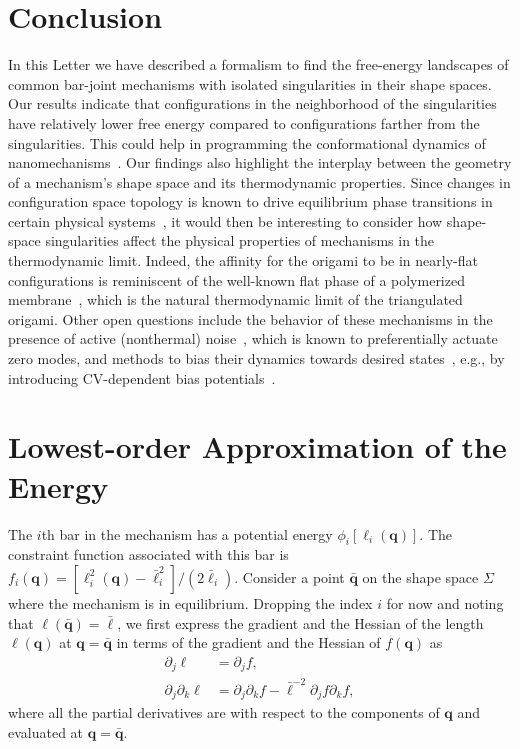\section{Conclusion}

In this Letter we have described a formalism to find the free-energy landscapes of common bar-joint mechanisms with isolated singularities in their shape spaces.
Our results indicate that configurations in the neighborhood of the singularities have relatively lower free energy compared to configurations farther from the singularities.
This could help in programming the conformational dynamics of nanomechanisms~\cite{dunn2015}.
Our findings also highlight the interplay between the geometry of a mechanism's shape space and its thermodynamic properties.
Since changes in configuration space topology is known to drive equilibrium phase transitions in certain physical systems~\cite{kastner2008}, it would then be interesting to consider how shape-space singularities affect the physical properties of mechanisms in the thermodynamic limit.
Indeed, the affinity for the origami to be in nearly-flat configurations is reminiscent of the well-known flat phase of a polymerized membrane~\cite{abraham1990,bowick1996}, which is the natural thermodynamic limit of the triangulated origami.
Other open questions include the behavior of these mechanisms in the presence of active (nonthermal) noise~\cite{woodhouse2018}, which is known to preferentially actuate zero modes, and methods to bias their dynamics towards desired states~\cite{kang2019}, e.g., by introducing CV-dependent bias potentials~\cite{kastner2011}.

\section{Lowest-order Approximation of the Energy}
\label{sm:sec:energy}

The $i$th bar in the mechanism has a potential energy $\phi_i[\ell_i(\bm{q})]$.
The constraint function associated with this bar is $f_i(\bm{q}) = [\ell_i^2(\bm{q}) - \bar{\ell}_i^2]/(2\bar{\ell}_i)$.
Consider a point $\bar{\bm{q}}$ on the shape space $\Sigma$ where the mechanism is in equilibrium.
Dropping the index $i$ for now and noting that $\ell(\bar{\bm{q}}) = \bar{\ell}$, we first express the gradient and the Hessian of the length $\ell(\bm{q})$ at $\bm{q} = \bar{\bm{q}}$ in terms of the gradient and the Hessian of $f(\bm{q})$ as
%
\begin{equation}
\begin{aligned}
  \partial_j \ell &= \partial_j f,\\
  \partial_j\partial_k \ell &= \partial_j\partial_k f - \bar{\ell}^{-2}\partial_j f\partial_k f,
  \label{sm:eq:lentomap}
\end{aligned}
\end{equation}
%
where all the partial derivatives are with respect to the components of $\bm{q}$ and evaluated at $\bm{q} = \bar{\bm{q}}$.

